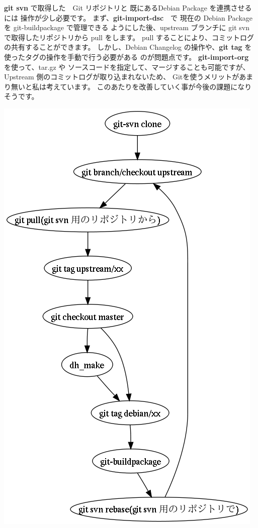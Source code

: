 \documentclass[mingoth,a4paper]{jsarticle}
\begin{document}
\begin{minipage}{0.5\hsize}
{\bf git svn} で取得した　Git リポジトリと 既にあるDebian Package を連携させるには
操作が少し必要です。
まず、{\bf git-import-dsc}　で 現在の Debian Package を git-buildpackage で管理できる
ようにした後、upstream ブランチに git svn で取得したリポジトリから pull をします。
pull することにより、コミットログの共有することができます。
しかし、Debian Changelog の操作や、{\bf git tag} を使ったタグの操作を手動で行う必要がある
のが問題点です。
{\bf git-import-org } を使って、tar.gz や ソースコードを指定して、マージすることも可能ですが、
Upstream 側のコミットログが取り込まれないため、 Gitを使うメリットがあまり無いと私は考えています。
このあたりを改善していく事が今後の課題になりそうです。
\end{minipage}
\begin{minipage}{0.5\hsize}
\includegraphics[width=0.8\hsize]{image200804/git-svn_with_build-package.png}
\end{minipage}
\end{document}
